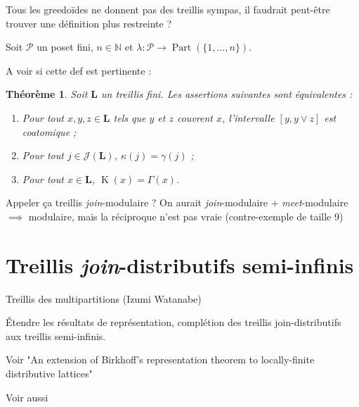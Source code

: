 \documentclass[leqno, 12pt]{amsart}
\numberwithin{equation}{section}
\newtheorem{thm}{Théorème}[section]
\renewcommand{\L}{\mathbf L}
\newcommand{\Pos}{\mathcal P}
\newcommand{\N}{\mathbb{N}}
\newcommand{\JIrr}{\mathcal J}
\newcommand{\Kappa}{\operatorname{K}}
\newcommand{\Part}{\operatorname{Part}}
\begin{document}
Tous les greedoïdes ne donnent pas des treillis sympas, il faudrait peut-être trouver une définition plus restreinte ?

Soit $\Pos$ un poset fini, $n\in \N$ et $\lambda:\Pos \to \Part(\{1,\dots, n\})$.

A voir si cette def est pertinente :

\begin{thm}
   Soit $\L$ un treillis fini. Les assertions suivantes sont équivalentes :
\begin{enumerate}
\item   Pour tout $x,y,z\in \L$ tels que $y$ et $z$ couvrent $x$, l'intervalle $[y,y\vee z]$ est coatomique ;
\item Pour tout $j\in \JIrr(\L)$, $\kappa(j)=\gamma(j)$ ;
\item Pour tout $x\in \L$, $\Kappa(x)=\Gamma(x)$.
\end{enumerate}
\end{thm}

Appeler ça treillis \emph{join}-modulaire ? On aurait \emph{join}-modulaire + \emph{meet}-modulaire $\implies$ modulaire, mais la réciproque n'est pas vraie (contre-exemple de taille 9)

\section{Treillis \emph{join}-distributifs semi-infinis}

Treillis des multipartitions (Izumi Watanabe)

Étendre les résultats de représentation, complétion des treillis join-distributifs aux treillis semi-infinis.

Voir "An extension of Birkhoff's representation theorem to locally-finite distributive lattices" \cite{Worl26}

Voir aussi \cite[Section 3]{AGT03}

{}

\end{document}
